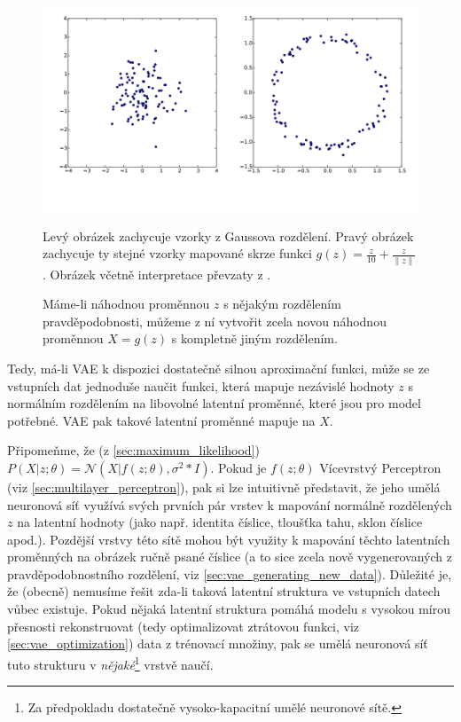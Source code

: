 \begin{figure}[H]
    \includegraphics[width=\textwidth]{img/latent_variable_ring_structure.png}
    \caption{Máme-li náhodnou proměnnou $z$ s nějakým rozdělením pravděpodobnosti, můžeme z ní vytvořit zcela novou náhodnou proměnnou $X = g(z)$ s kompletně jiným rozdělením.}
    Levý obrázek zachycuje vzorky z Gaussova rozdělení. Pravý obrázek zachycuje ty stejné vzorky mapované skrze funkci $g(z) = \frac{z}{10} + \frac{z}{\| z \|}$.
    Obrázek včetně interpretace převzaty z \cite{Doersch2021}.
    \label{fig:latent_variable_ring_structure}
\end{figure}

Tedy, má-li VAE k dispozici dostatečně silnou aproximační funkci, může se ze vstupních dat jednoduše naučit funkci, která mapuje nezávislé hodnoty $z$ s normálním rozdělením na libovolné latentní proměnné, které jsou pro model potřebné.
VAE pak takové latentní proměnné mapuje na $X$.   \cite{Doersch2021}

Připomeňme, že (z \autoref{sec:maximum_likelihood}) $P(X|z;\theta) = \mathcal{N}(X|f(z;\theta), \sigma^2 * I)$.
Pokud je $f(z;\theta)$ Vícevrstvý Perceptron (viz \autoref{sec:multilayer_perceptron}), pak si lze intuitivně představit, že jeho umělá neuronová síť využívá svých prvních pár vrstev k mapování normálně rozdělených $z$ na latentní hodnoty (jako např. identita číslice, tloušťka tahu, sklon číslice apod.).
Pozdější vrstvy této sítě mohou být využity k mapování těchto latentních proměnných na obrázek ručně psané číslice (a to sice zcela nově vygenerovaných z pravděpodobnostního rozdělení, viz \autoref{sec:vae_generating_new_data}).
Důležité je, že (obecně) nemusíme řešit zda-li taková latentní struktura ve vstupních datech vůbec existuje.
Pokud nějaká latentní struktura pomáhá modelu s vysokou mírou přesnosti rekonstruovat (tedy optimalizovat ztrátovou funkci, viz \autoref{sec:vae_optimization}) data z trénovací množiny, pak se umělá neuronová síť tuto strukturu v \emph{nějaké}\footnote{Za předpokladu dostatečně vysoko-kapacitní umělé neuronové sítě.} vrstvě naučí. \cite{Doersch2021}



